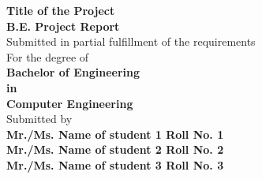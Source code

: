 \begin{center}
{\LARGE \bf Title of the Project} \\
\vspace{0.3in}
{\LARGE \bf B.E. Project Report}\\
\large Submitted in partial fulfillment of the requirements\\
For the degree of\\
\vspace{0.2in}
\Large{\bf{Bachelor of Engineering}}\\
\vspace{-0.1in}
{\bf in}\\
\vspace{-0.1in}
\Large{\bf{Computer Engineering}}\\
\vspace{0.2in}
\large Submitted by\\
\vspace{0.1in}
{\Large \bf Mr./Ms. Name of student 1 \hspace{0.05in} Roll No. 1}\\
{\Large \bf Mr./Ms. Name of student 2 \hspace{0.15in} Roll No. 2}\\
{\Large \bf Mr./Ms. Name of student 3 \hspace{0.15in} Roll No. 3}\\


\end{center}

